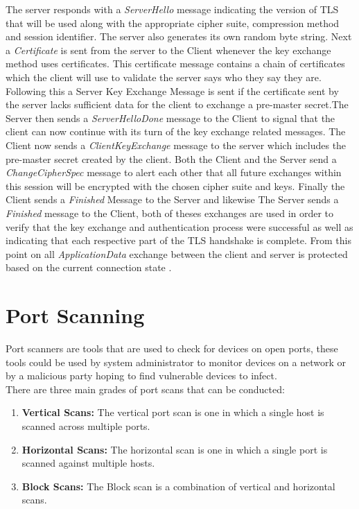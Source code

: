 \documentclass[a4wide,leqno,12pt]{report}
\begin{document}
The server responds with a \textit{ServerHello} message indicating the version of TLS that will be used along with the appropriate cipher suite, compression method and session identifier. The server also generates its own random byte string. Next a \textit{Certificate} is sent from the server to the Client whenever the key exchange method uses certificates. This certificate message contains a chain of certificates which the client will use to validate the server says who they say they are. Following this a Server Key Exchange Message is sent if the certificate sent by the server lacks sufficient data for the client to exchange a pre-master secret.The Server then sends a \textit{ServerHelloDone} message to the Client to signal that the client can now continue with its turn of the key exchange related messages. The Client now sends a \textit{ClientKeyExchange} message to the server which includes the pre-master secret created by the client. Both the Client and the Server send a \textit{ChangeCipherSpec} message to alert each other that all future exchanges within this session will be encrypted with the chosen cipher suite and keys. Finally the Client sends a \textit{Finished} Message to the Server and likewise The Server sends a \textit{Finished } message to the Client, both of theses exchanges are used in order to verify that the key exchange and authentication process were successful as well as indicating that each respective part of the TLS handshake is complete. From this point on all \textit{ApplicationData} exchange between the client and server is protected based on the current connection state \cite{tlsDemoServer}\cite{turner2014transport}.\\

\section{Port Scanning}

Port scanners are tools that are used to check for devices on open ports, these tools could be used by system administrator to monitor devices on a network or by a malicious party hoping to find vulnerable devices to infect.\\
There are three main grades of port scans that can be conducted:
\begin{enumerate}
\item\textbf{Vertical Scans:}
The vertical port scan is one in which a single host is scanned across multiple ports.
\item\textbf{Horizontal Scans:}
The horizontal scan is one in which a single port is scanned against multiple hosts.
\item\textbf{Block Scans:}
The Block scan is a combination of vertical and horizontal scans.\cite{lee2003detection}
\end{enumerate}
\end{document}
